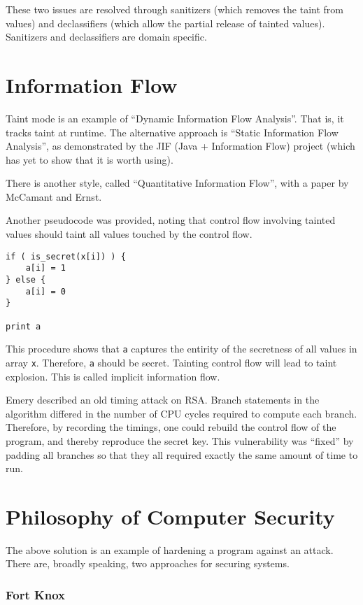 \documentclass[twoside]{article}
\begin{document}
These two issues are resolved through sanitizers (which removes the taint from values) and declassifiers (which allow the partial release of tainted values). Sanitizers and declassifiers are domain specific.

\section{Information Flow}

Taint mode is an example of ``Dynamic Information Flow Analysis''. That is, it tracks taint at runtime. The alternative approach is ``Static Information Flow Analysis'', as demonstrated by the JIF (Java + Information Flow) project (which has yet to show that it is worth using).

There is another style, called ``Quantitative Information Flow'', with a paper by McCamant and Ernst.

Another pseudocode was provided, noting that control flow involving tainted values should taint all values touched by the control flow.

\begin{lstlisting}
if ( is_secret(x[i]) ) {
    a[i] = 1
} else {
    a[i] = 0
}

print a
\end{lstlisting}

This procedure shows that \texttt{a} captures the entirity of the secretness of all values in array \texttt{x}. Therefore, \texttt{a} should be secret. Tainting control flow will lead to taint explosion. This is called implicit information flow.

Emery described an old timing attack on RSA. Branch statements in the algorithm differed in the number of CPU cycles required to compute each branch. Therefore, by recording the timings, one could rebuild the control flow of the program, and thereby reproduce the secret key. This vulnerability was ``fixed'' by padding all branches so that they all required exactly the same amount of time to run.

\section{Philosophy of Computer Security}

The above solution is an example of hardening a program against an attack. There are, broadly speaking, two approaches for securing systems.

\subsubsection*{Fort Knox}
\end{document}
